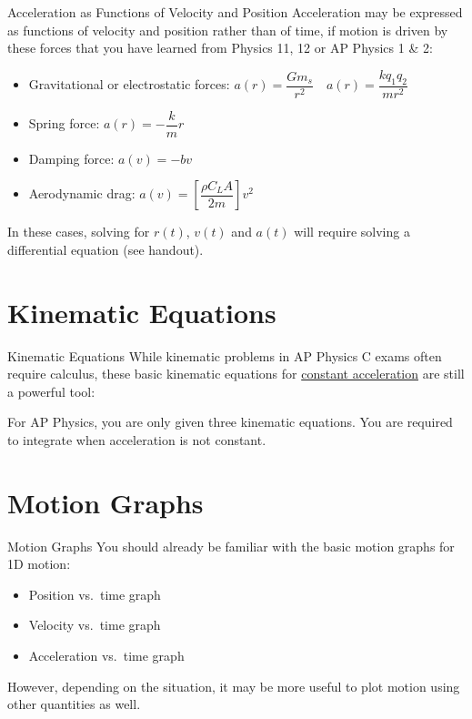 \documentclass[12pt,compress,aspectratio=169,dvipsnames]{beamer}
\begin{document}
\begin{frame}{Acceleration as Functions of Velocity and Position}
  Acceleration may be expressed as functions of velocity and position rather
  than of time, if motion is driven by these forces that you have learned from
  Physics 11, 12 or AP Physics 1 \& 2:
  \begin{itemize}
  \item Gravitational or electrostatic forces:
    $a(r)=\dfrac{Gm_s}{r^2}\quad a(r)=\dfrac{kq_1q_2}{mr^2}$
  \item Spring force: $a(r)=-\dfrac kmr$
  \item Damping force: $a(v)=-bv$
  \item Aerodynamic drag:
    $a(v)=\left[\dfrac{\rho C_L A}{2m}\right] v^2$
  \end{itemize}

  \vspace{.1in}In these cases, solving for $r(t)$, $v(t)$ and $a(t)$ will
  require solving a differential equation (see handout).
\end{frame}



\section{Kinematic Equations}

\begin{frame}{Kinematic Equations}
  While kinematic problems in AP Physics C exams often require calculus, these
  basic kinematic equations for \underline{constant acceleration} are still a
  powerful tool:

  \vspace{-.25in}{\large
    \begin{align*}
      x &= x_0+ v_0t + \frac12at^2\\
      v &= v_0+at\\
      v^2 &= v_0^2+ 2a(x-x_0)
    \end{align*}
  }

  For AP Physics, you are only given three kinematic equations. You are
  required to integrate when acceleration is not constant.
\end{frame}



\section{Motion Graphs}

\begin{frame}{Motion Graphs}
  You should already be familiar with the basic motion graphs for 1D motion:
  \begin{itemize}
  \item Position vs.\ time graph
  \item Velocity vs.\ time graph
  \item Acceleration vs.\ time graph
  \end{itemize}

  However, depending on the situation, it may be more useful to plot motion
  using other quantities as well.
\end{frame}
\end{document}
